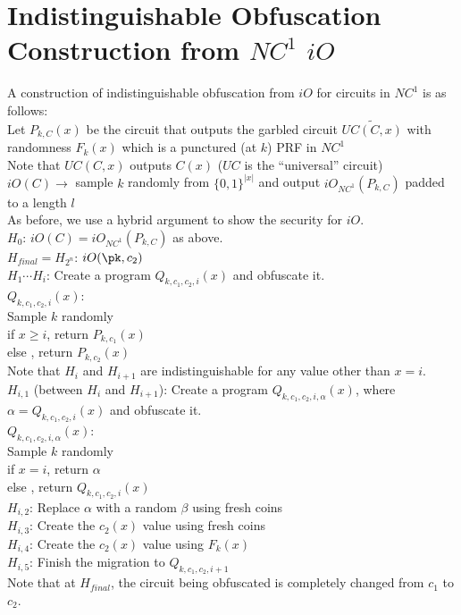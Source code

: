 \section{Indistinguishable Obfuscation Construction from $NC^1$ $iO$}
A construction of indistinguishable obfuscation from $iO$ for circuits in $NC^1$ is as follows:\\
Let $P_{k,C}(x)$ be the circuit that outputs the garbled circuit $\widetilde{UC(C,x)}$ with randomness $F_k(x)$ which is a punctured (at $k$) PRF in $NC^1$\\
\indent Note that $UC(C,x)$ outputs $C(x)$ ($UC$ is the ``universal'' circuit)\\
$iO(C) \rightarrow $ sample $k$ randomly from $\{0,1\}^{|x|}$ and output $iO_{NC^1}(P_{k,C})$ padded to a length $l$\\

As before, we use a hybrid argument to show the security for $iO$.\\
\noindent $H_0$: $iO(C) = iO_{NC^1}(P_{k,C})$ as above.\\
\noindent $H_{final} = H_{2^n}$: $iO(\pk, c_2)$\\
\noindent $H_1 \cdots H_i$: Create a program $Q_{k, c_1, c_2, i}(x)$ and obfuscate it.\\
$Q_{k,c_1,c_2,i}(x)$:\\
\indent Sample $k$ randomly\\
\indent if $x \ge i$, return $P_{k,c_1}(x)$\\
\indent else , return $P_{k,c_2}(x)$\\
\noindent Note that $H_i$ and $H_{i+1}$ are indistinguishable for any value other than $x=i$.\\
\noindent $H_{i,1}$ (between $H_i$ and $H_{i+1}$): Create a program $Q_{k, c_1, c_2, i, \alpha}(x)$, where $\alpha = Q_{k, c_1, c_2, i}(x)$ and obfuscate it.\\
$Q_{k, c_1, c_2, i, \alpha}(x)$:\\
\indent Sample $k$ randomly\\
\indent if $x = i$, return $\alpha$\\
\indent else , return $Q_{k,c_1,c_2, i}(x)$\\

\noindent $H_{i,2}$: Replace $\alpha$ with a random $\beta$ using fresh coins\\
\noindent $H_{i,3}$: Create the $c_2(x)$ value using fresh coins\\
\noindent $H_{i,4}$: Create the $c_2(x)$ value using $F_k(x)$\\
\noindent $H_{i,5}$: Finish the migration to $Q_{k,c_1,c_2,i+1}$\\

Note that at $H_{final}$, the circuit being obfuscated is completely changed from $c_1$ to $c_2$.




